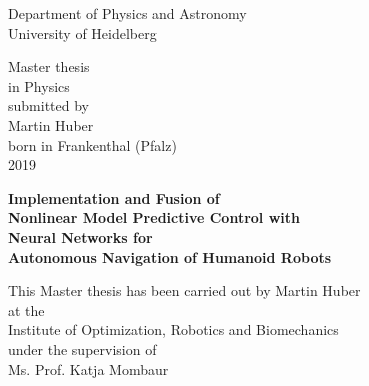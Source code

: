 
\thispagestyle{empty}
\begin{center}
  \renewcommand{\baselinestretch}{2.00}
  \Large\sffamily
  Department of Physics and Astronomy\\
  \large University of Heidelberg
  \par\vfill\normalfont
  Master thesis\\
  in Physics\\
  submitted by\\
  Martin Huber\\
  born in Frankenthal (Pfalz)\\
  2019
\end{center}
\newpage

\thispagestyle{empty}
\begin{center}
  \renewcommand{\baselinestretch}{2.00}
  \Large\bfseries\sffamily
    Implementation and Fusion of \\
	Nonlinear Model Predictive Control with \\
	Neural Networks for \\ 
	Autonomous Navigation of Humanoid Robots
  \par
  \vfill
  \large\normalfont
  This Master thesis has been carried out by Martin Huber\\
  at the\\
  Institute of Optimization, Robotics and Biomechanics \\
  under the supervision of\\
  Ms. Prof. Katja Mombaur
\end{center}\par
\vspace{5\baselineskip}

\renewcommand{\baselinestretch}{1.00}\normalsize